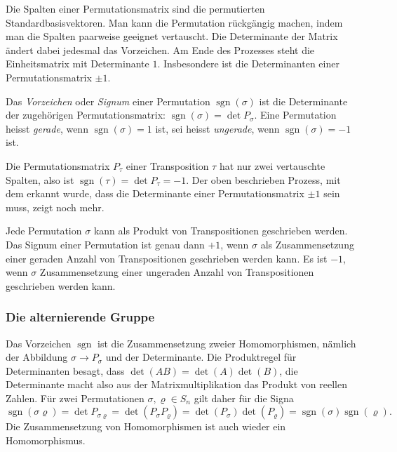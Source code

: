 Die Spalten einer Permutationsmatrix sind die permutierten
Standardbasisvektoren.
Man kann die Permutation rückgängig machen, indem man die Spalten
paarweise geeignet vertauscht.
Die Determinante der Matrix ändert dabei jedesmal das Vorzeichen.
Am Ende des Prozesses steht die Einheitsmatrix mit Determinante $1$.
Insbesondere ist die Determinanten einer Permutationsmatrix $\pm 1$.

\begin{definition}
%
%
Das {\em Vorzeichen} oder {\em Signum} einer Permutation
$\operatorname{sgn}(\sigma)$
ist die Determinante der zugehörigen Permutationsmatrix:
$\operatorname{sgn}(\sigma)=\det P_\sigma$.
Eine Permutation heisst {\em gerade}, wenn $\operatorname{sgn}(\sigma)=1$ ist,
sei heisst {\em ungerade}, wenn $\operatorname{sgn}(\sigma)=-1$ ist.
%
%
\end{definition}

Die Permutationsmatrix $P_\tau$ einer Transposition $\tau$ hat nur
zwei vertauschte Spalten, also ist $\operatorname{sgn}(\tau)=\det P_\tau=-1$.
Der oben beschrieben Prozess, mit dem erkannt wurde, dass die Determinante
einer Permutationsmatrix $\pm 1$ sein muss, zeigt noch mehr.

\begin{satz}
Jede Permutation $\sigma$ kann als Produkt von Transpositionen
geschrieben werden.
Das Signum einer Permutation ist genau dann $+1$, wenn $\sigma$
als Zusammensetzung einer geraden Anzahl von Transpositionen
geschrieben werden kann.
Es ist $-1$, wenn $\sigma$ Zusammensetzung einer ungeraden Anzahl
von Transpositionen geschrieben werden kann.
\end{satz}

%
%
\subsubsection{Die alternierende Gruppe}
Das Vorzeichen $\operatorname{sgn}$ ist die Zusammensetzung zweier
Homomorphismen, nämlich der Abbildung $\sigma\to P_\sigma$
und der Determinante.
Die Produktregel für Determinanten besagt, dass $\det(AB)=\det(A)\det(B)$,
die Determinante macht also aus der Matrixmultiplikation das Produkt von
reellen Zahlen.
Für zwei Permutationen $\sigma,\varrho\in S_n$ gilt daher für die Signa
\[
\operatorname{sgn}(\sigma\varrho)
=
\det P_{\sigma\varrho}
=
\det(P_\sigma P_\varrho)
=
\det(P_\sigma)\det( P_\varrho)
=
\operatorname{sgn}(\sigma)
\operatorname{sgn}(\varrho).
\]
Die Zusammensetzung von Homomorphismen ist auch wieder ein Homomorphismus.

